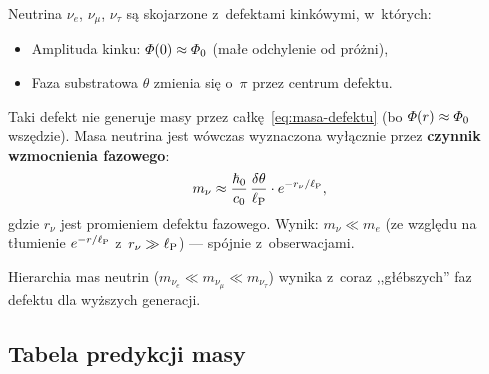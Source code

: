 \begin{proposition}%
\label{prop:neutrinos}
Neutrina $\nu_e$, $\nu_\mu$, $\nu_\tau$ s\k{a} skojarzone
z~defektami kink\'owymi, w~kt\'orych:
\begin{itemize}[nosep]
    \item Amplituda kinku: $\varPhi(0) \approx \varPhi_0$
          (ma\l{}e odchylenie od pr\'o\.zni),
    \item Faza substratowa $\theta$ zmienia si\k{e} o~$\pi$
          przez centrum defektu.
\end{itemize}
Taki defekt nie generuje masy przez ca\l{}k\k{e}~\eqref{eq:masa-defektu}
(bo $\varPhi(r) \approx \varPhi_0$ wsz\k{e}dzie).
Masa neutrina jest wówczas wyznaczona wy\l{}\k{a}cznie
przez \textbf{czynnik wzmocnienia fazowego}:
\begin{equation}\label{eq:neutrino-mass}
    m_\nu \approx \frac{\hbar_0}{c_0}\,
    \frac{\delta\theta}{\ell_{\mathrm{P}}} \cdot e^{-r_{\nu}/\ell_{\mathrm{P}}},
\end{equation}
gdzie $r_\nu$ jest promieniem defektu fazowego.
Wynik: $m_\nu \ll m_e$ (ze wzgl\k{e}du na t\l{}umienie $e^{-r/\ell_{\mathrm{P}}}$
z~$r_\nu \gg \ell_{\mathrm{P}}$) --- sp\'ojnie z~obserwacjami.

Hierarchia mas neutrin ($m_{\nu_e} \ll m_{\nu_\mu} \ll m_{\nu_\tau}$)
wynika z~coraz ,,g\l{}\'ebszych'' faz defektu dla wy\.zszych generacji.
\end{proposition}

\subsection{Tabela predykcji masy}%
\label{app:F-predictions}

